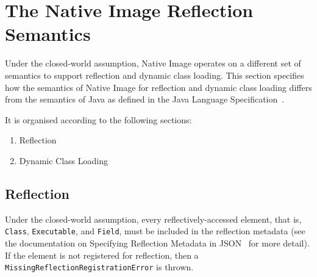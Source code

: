
\chapter{The Native Image Reflection Semantics}\label{native_image_specs}
Under the closed-world assumption, Native Image operates on a different set of semantics to support reflection and dynamic class loading. This section specifies how the semantics of Native Image for reflection and dynamic class loading differs from the semantics of Java as defined in the Java Language Specification~\cite{noauthor_java_nodate-3}.

It is organised according to the following sections:
\begin{enumerate}
    \item Reflection
    \item Dynamic Class Loading
\end{enumerate}

\section{Reflection}\label{reflection_specs}
Under the closed-world assumption, every reflectively-accessed element, that is, \texttt{Class}, \texttt{Executable}, and \texttt{Field}, must be included in the reflection metadata (see the documentation on Specifying Reflection Metadata in JSON~\cite{noauthor_reachability_nodate} for more detail). If the element is not registered for reflection, then a \texttt{MissingReflectionRegistrationError} is thrown.

